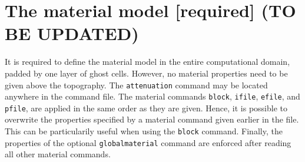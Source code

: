 \documentclass[11pt]{report}
\begin{document}
\section{The material model [required] (TO BE UPDATED)} 

It is required to define the material model in the entire computational domain, padded by one layer
of ghost cells. However, no material properties need to be given above the topography. The
\verb+attenuation+ command may be located anywhere in the command file. The material commands
\verb+block+, \verb+ifile+, \verb+efile+, and \verb+pfile+, are applied in the same order as they
are given. Hence, it is possible to overwrite the properties specified by a material command given
earlier in the file. This can be particularily useful when using the \verb+block+ command. Finally,
the properties of the optional \verb+globalmaterial+ command are enforced after reading all other
material commands.

\end{document}
